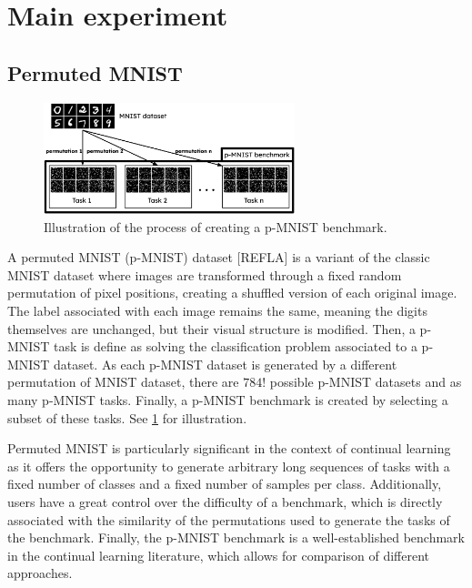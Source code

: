 \documentclass[11pt]{article}
\begin{document}
\section{Main experiment}



\subsection{Permuted MNIST}


\begin{figure}
    \centering
    \includegraphics[width=0.65\textwidth]{images/p-MNIST.png}
    \caption{Illustration of the process of creating a p-MNIST benchmark.}
    \label{fig:p-MNIST}
\end{figure}

A permuted MNIST (p-MNIST) dataset [REFLA] is a variant of the classic MNIST dataset where images are transformed through a fixed random permutation of pixel positions, creating a shuffled version of each original image. The label associated with each image remains the same, meaning the digits themselves are unchanged, but their visual structure is modified. Then, a p-MNIST task is define as solving the classification problem associated to a p-MNIST dataset. As each p-MNIST dataset is generated by a different permutation of MNIST dataset, there are $784!$ possible p-MNIST datasets and as many p-MNIST tasks. Finally, a p-MNIST benchmark is created by selecting a subset of these tasks. See \ref{fig:p-MNIST} for illustration.

\vspace{2mm}
\noindent
Permuted MNIST is particularly significant in the context of continual learning as it offers the opportunity to generate arbitrary long sequences of tasks with a fixed number of classes and a fixed number of samples per class. Additionally, users have a great control over the difficulty of a benchmark, which is directly associated with the similarity of the permutations used to generate the tasks of the benchmark. Finally, the p-MNIST benchmark is a well-established benchmark in the continual learning literature, which allows for comparison of different approaches.
\end{document}
